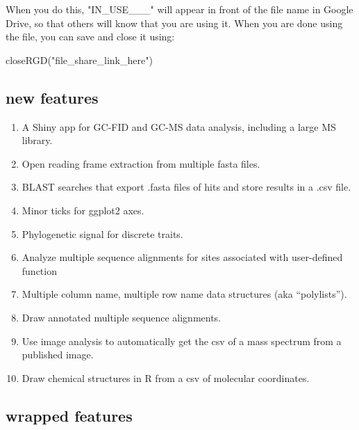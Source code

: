 \documentclass[
]{krantz}
\newenvironment{Shaded}{\begin{snugshade}}{\end{snugshade}}
\newcommand{\FunctionTok}[1]{\textcolor[rgb]{0.00,0.00,0.00}{#1}}
\newcommand{\NormalTok}[1]{#1}
\newcommand{\StringTok}[1]{\textcolor[rgb]{0.31,0.60,0.02}{#1}}
\providecommand{\tightlist}{%
  \setlength{\itemsep}{0pt}\setlength{\parskip}{0pt}}
\begin{document}
\hfill\break
When you do this, "IN\_USE\_\_\_" will appear in front of the file name in Google Drive, so that others will know that you are using it. When you are done using the file, you can save and close it using:

\begin{Shaded}
\begin{Highlighting}[]
\FunctionTok{closeRGD}\NormalTok{(}\StringTok{"file\_share\_link\_here"}\NormalTok{)}
\end{Highlighting}
\end{Shaded}

\hypertarget{new-features}{%
\subsection{new features}\label{new-features}}

\begin{enumerate}
\def\labelenumi{\arabic{enumi}.}
\tightlist
\item
  A Shiny app for GC-FID and GC-MS data analysis, including a large MS library.
\item
  Open reading frame extraction from multiple fasta files.
\item
  BLAST searches that export .fasta files of hits and store results in a .csv file.
\item
  Minor ticks for ggplot2 axes.
\item
  Phylogenetic signal for discrete traits.
\item
  Analyze multiple sequence alignments for sites associated with user-defined function
\item
  Multiple column name, multiple row name data structures (aka ``polylists'').
\item
  Draw annotated multiple sequence alignments.
\item
  Use image analysis to automatically get the csv of a mass spectrum from a published image.
\item
  Draw chemical structures in R from a csv of molecular coordinates.
\end{enumerate}

\hypertarget{wrapped-features}{%
\subsection{wrapped features}\label{wrapped-features}}
\end{document}
